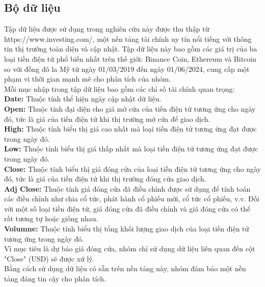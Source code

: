 \documentclass[conference]{IEEEtran}
\begin{document}
	\subsection{Bộ dữ liệu}\label{AA}
	Tập dữ liệu được sử dụng trong nghiên cứu này được thu thập từ https://www.investing.com/, một nền tảng tài chính uy tín nổi tiếng với thông tin thị trường toàn diện và cập nhật. Tập dữ liệu này bao gồm các giá trị của ba loại tiền điện tử phổ biến nhất trên thế giới: Binance Coin, Ethereum và Bitcoin so với đồng đô la Mỹ từ ngày 01/03/2019 đến ngày 01/06/2024, cung cấp một phạm vi thời gian mạnh mẽ cho phân tích của nhóm.\\
	Mỗi mục nhập trong tập dữ liệu bao gồm các chỉ số tài chính quan trọng:\\
	\textbf{Date:} Thuộc tính thể hiện ngày cập nhật dữ liệu.\\
	\textbf{Open:} Thuộc tính đại diện cho giá mở cửa của tiền điện tử tương ứng cho ngày đó, tức là giá của tiền điện tử khi thị trường mở cửa để giao dịch.\\
	\textbf{High:} Thuộc tính biểu thị giá cao nhất mà loại tiền điện tử tương ứng đạt được trong ngày đó.\\
	\textbf{Low:} Thuộc tính biểu thị giá thấp nhất mà loại tiền điện tử tương ứng đạt được trong ngày đó.\\
	\textbf{Close:} Thuộc tính biểu thị giá đóng cửa của loại tiền điện tử tương ứng cho ngày đó, tức là giá của tiền điện tử khi thị trường đóng cửa giao dịch.\\
	\textbf{Adj Close:} Thuộc tính giá đóng cửa đã điều chỉnh được sử dụng để tính toán các điều chỉnh như chia cổ tức, phát hành cổ phiếu mới, cổ tức cổ phiếu, v.v. Đối với một số loại tiền điện tử, giá đóng cửa đã điều chỉnh và giá đóng cửa có thể rất tương tự hoặc giống nhau.\\
	\textbf{Volumne:} Thuộc tính biểu thị tổng khối lượng giao dịch của loại tiền điện tử tương ứng trong ngày đó.\\
	Vì mục tiêu là dự báo giá đóng cửa, nhóm chỉ sử dụng dữ liệu liên quan đến cột "Close" (USD) sẽ được xử lý.\\
	Bằng cách sử dụng dữ liệu có sẵn trên nền tảng này, nhóm đảm bảo một nền tảng đáng tin cậy cho phân tích.
	
\end{document}
